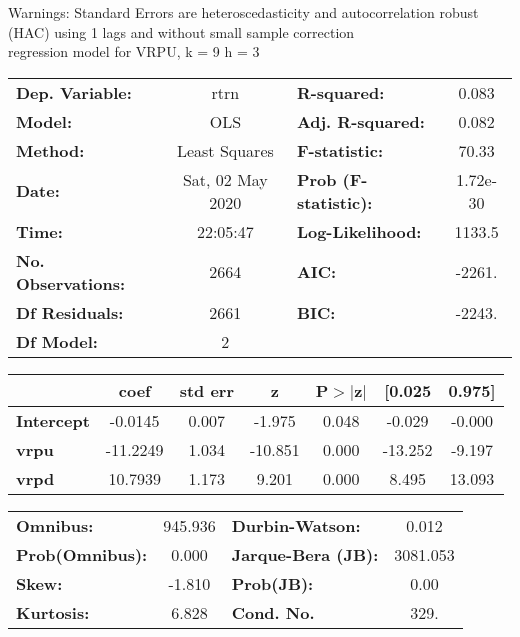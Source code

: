 Warnings: \newline
 [1] Standard Errors are heteroscedasticity and autocorrelation robust (HAC) using 1 lags and without small sample correction\\ 

regression model for VRPU, k = 9 h = 3\begin{center}
\begin{tabular}{lclc}
\toprule
\textbf{Dep. Variable:}    &       rtrn       & \textbf{  R-squared:         } &     0.083   \\
\textbf{Model:}            &       OLS        & \textbf{  Adj. R-squared:    } &     0.082   \\
\textbf{Method:}           &  Least Squares   & \textbf{  F-statistic:       } &     70.33   \\
\textbf{Date:}             & Sat, 02 May 2020 & \textbf{  Prob (F-statistic):} &  1.72e-30   \\
\textbf{Time:}             &     22:05:47     & \textbf{  Log-Likelihood:    } &    1133.5   \\
\textbf{No. Observations:} &        2664      & \textbf{  AIC:               } &    -2261.   \\
\textbf{Df Residuals:}     &        2661      & \textbf{  BIC:               } &    -2243.   \\
\textbf{Df Model:}         &           2      & \textbf{                     } &             \\
\bottomrule
\end{tabular}
\begin{tabular}{lcccccc}
                   & \textbf{coef} & \textbf{std err} & \textbf{z} & \textbf{P$> |$z$|$} & \textbf{[0.025} & \textbf{0.975]}  \\
\midrule
\textbf{Intercept} &      -0.0145  &        0.007     &    -1.975  &         0.048        &       -0.029    &       -0.000     \\
\textbf{vrpu}      &     -11.2249  &        1.034     &   -10.851  &         0.000        &      -13.252    &       -9.197     \\
\textbf{vrpd}      &      10.7939  &        1.173     &     9.201  &         0.000        &        8.495    &       13.093     \\
\bottomrule
\end{tabular}
\begin{tabular}{lclc}
\textbf{Omnibus:}       & 945.936 & \textbf{  Durbin-Watson:     } &    0.012  \\
\textbf{Prob(Omnibus):} &   0.000 & \textbf{  Jarque-Bera (JB):  } & 3081.053  \\
\textbf{Skew:}          &  -1.810 & \textbf{  Prob(JB):          } &     0.00  \\
\textbf{Kurtosis:}      &   6.828 & \textbf{  Cond. No.          } &     329.  \\
\bottomrule
\end{tabular}
\end{center}

